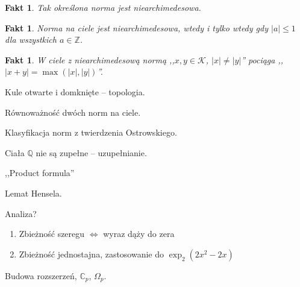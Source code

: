 \documentclass[a4paper, fleqn]{extreport}
\newcounter{dummy}
\numberwithin{dummy}{section}
\newtheorem{fakt}[dummy]{Fakt}
\begin{document}
\begin{fakt}
	Tak określona norma jest niearchimedesowa.
\end{fakt}

\begin{fakt}
Norma na ciele jest niearchimedesowa, wtedy i tylko wtedy gdy $|a| \le 1$ dla wszystkich $a \in \mathbb Z$.
\end{fakt}

\begin{fakt}
	W ciele z niearchimedesową normą ,,$x, y \in \mathcal K$, $|x| \neq |y|$'' pociąga ,,$|x+y| = \max (|x|, |y|)$''.
\end{fakt}

Kule otwarte i domknięte -- topologia.

Równoważność dwóch norm na ciele.

Klasyfikacja norm z twierdzenia Ostrowskiego.

Ciała $\mathbb Q$ nie są zupełne -- uzupełnianie.

,,Product formula''

Lemat Hensela.

\newpage



\newpage

Analiza?
\begin{enumerate}
\item Zbieżność szeregu $\iff$ wyraz dąży do zera
\item Zbieżność jednostajna, zastosowanie do $\exp_2(2x^2 - 2x)$
\end{enumerate}

Budowa rozszerzeń, $\mathbb C_p$, $\Omega_p$.
\end{document}
